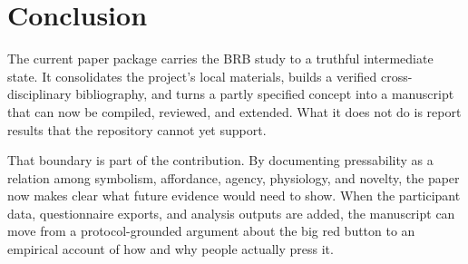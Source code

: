 \section{Conclusion}

The current paper package carries the BRB study to a truthful intermediate state. It consolidates the project's local materials, builds a verified cross-disciplinary bibliography, and turns a partly specified concept into a manuscript that can now be compiled, reviewed, and extended. What it does not do is report results that the repository cannot yet support.

That boundary is part of the contribution. By documenting pressability as a relation among symbolism, affordance, agency, physiology, and novelty, the paper now makes clear what future evidence would need to show. When the participant data, questionnaire exports, and analysis outputs are added, the manuscript can move from a protocol-grounded argument about the big red button to an empirical account of how and why people actually press it.
